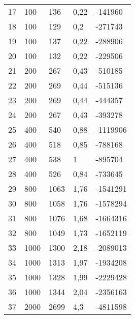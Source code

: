 \begin{longtable}{lllll}
    17               & 100            & 136            & 0,22      & -141960         \\
    18               & 100            & 129            & 0,2       & -271743         \\
    19               & 100            & 137            & 0,22      & -288906         \\
    20               & 100            & 132            & 0,22      & -229506         \\
    21               & 200            & 267            & 0,43      & -510185         \\
    22               & 200            & 269            & 0,44      & -515136         \\
    23               & 200            & 269            & 0,44      & -444357         \\
    24               & 200            & 267            & 0,43      & -393278         \\
    25               & 400            & 540            & 0,88      & -1119906        \\
    26               & 400            & 518            & 0,85      & -788168         \\
    27               & 400            & 538            & 1         & -895704         \\
    28               & 400            & 526            & 0,84      & -733645         \\
    29               & 800            & 1063           & 1,76      & -1541291        \\
    30               & 800            & 1058           & 1,76      & -1578294        \\
    31               & 800            & 1076           & 1,68      & -1664316        \\
    32               & 800            & 1049           & 1,73      & -1652119        \\
    33               & 1000           & 1300           & 2,18      & -2089013        \\
    34               & 1000           & 1313           & 1,97      & -1934208        \\
    35               & 1000           & 1328           & 1,99      & -2229428        \\
    36               & 1000           & 1344           & 2,04      & -2356163        \\
    37               & 2000           & 2699           & 4,3       & -4811598        \\

\end{longtable}
